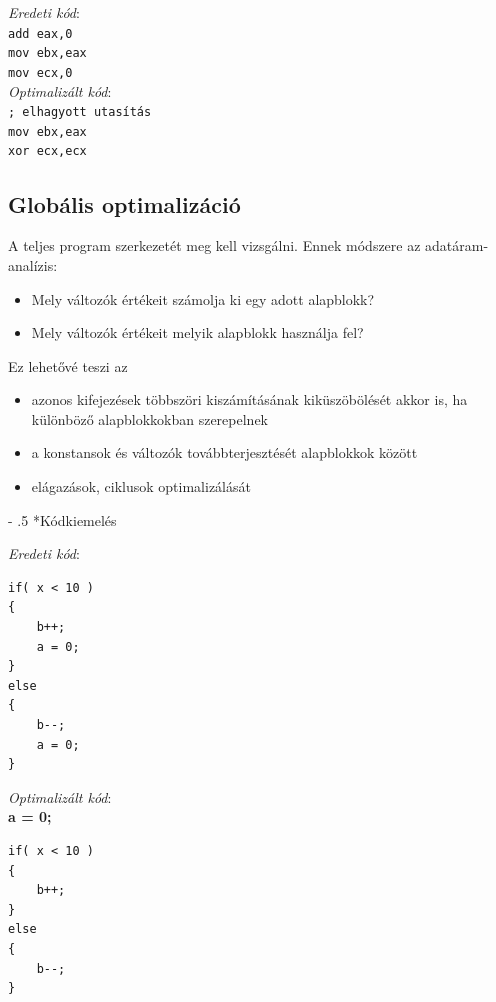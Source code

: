 \documentclass[12pt,margin=0px]{article}
\makeatletter
\renewcommand\paragraph{%
	\@startsection{paragraph}{4}{0mm}%
	{-\baselineskip}%
	{.5\baselineskip}%
	{\normalfont\normalsize\bfseries}}
\makeatother
\begin{document}
    \noindent \emph{Eredeti kód}:\\
    \texttt{add eax,0}\\
    \texttt{mov ebx,eax}\\
    \texttt{mov ecx,0}\\

    \noindent \emph{Optimalizált kód}:\\
    \texttt{; elhagyott utasítás}\\
    \texttt{mov ebx,eax}\\
    \texttt{xor ecx,ecx}

    \subsection*{Globális optimalizáció}

	A teljes program szerkezetét meg kell vizsgálni. Ennek módszere az adatáram-analízis:
	\begin{itemize}
		\item
		Mely változók értékeit számolja ki egy adott alapblokk?
		\item
		Mely változók értékeit melyik alapblokk használja fel?
	\end{itemize}
	
    \noindent Ez lehetővé teszi az
    \begin{itemize}
        \item azonos kifejezések többszöri kiszámításának kiküszöbölését akkor is, ha különböző alapblokkokban szerepelnek
        \item a konstansok és változók továbbterjesztését alapblokkok között
        \item elágazások, ciklusok optimalizálását
    \end{itemize}

    \paragraph*{Kódkiemelés}
    
\newenvironment{lbmatrix}{\begin{bmatrix*}[l]}{\end{bmatrix*}}    
    
    \noindent \emph{Eredeti kód}:
    \begin{verbatim}
if( x < 10 )
{
    b++;
    a = 0;
}
else
{
    b--;
    a = 0;
}
    \end{verbatim}
\newpage
    \noindent \emph{Optimalizált kód}:\\
    \noindent \textbf{a = 0;}
    \begin{verbatim}
if( x < 10 )
{
    b++;
}
else
{
    b--;
}
    \end{verbatim}
\end{document}
